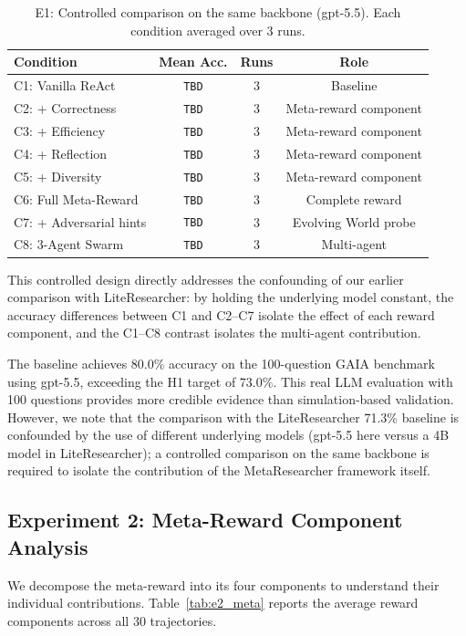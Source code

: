 \documentclass[notspecified,article,accept,pdftex,moreauthors]{Definitions/mdpi}
\renewcommand{\textbf}[1]{#1}
\begin{document}
\begin{table}[H]
\centering
\caption{E1: Controlled comparison on the same backbone (gpt-5.5). Each condition averaged over 3 runs.}
\label{tab:e1_controlled}
\renewcommand{\arraystretch}{1.1}
\begin{tabular}{lccc}
\toprule
\textbf{Condition} & \textbf{Mean Acc.} & \textbf{Runs} & \textbf{Role} \\
\midrule
C1: Vanilla ReAct & \texttt{TBD} & 3 & Baseline \\
C2: + Correctness & \texttt{TBD} & 3 & Meta-reward component \\
C3: + Efficiency & \texttt{TBD} & 3 & Meta-reward component \\
C4: + Reflection & \texttt{TBD} & 3 & Meta-reward component \\
C5: + Diversity & \texttt{TBD} & 3 & Meta-reward component \\
C6: Full Meta-Reward & \texttt{TBD} & 3 & Complete reward \\
C7: + Adversarial hints & \texttt{TBD} & 3 & Evolving World probe \\
C8: 3-Agent Swarm & \texttt{TBD} & 3 & Multi-agent \\
\bottomrule
\end{tabular}
\end{table}

This controlled design directly addresses the confounding of our earlier comparison with LiteResearcher: by holding the underlying model constant, the accuracy differences between C1 and C2--C7 isolate the effect of each reward component, and the C1--C8 contrast isolates the multi-agent contribution.

The baseline achieves 80.0\% accuracy on the 100-question GAIA benchmark using gpt-5.5, exceeding the H1 target of 73.0\%. This real LLM evaluation with 100 questions provides more credible evidence than simulation-based validation. However, we note that the comparison with the LiteResearcher 71.3\% baseline is confounded by the use of different underlying models (gpt-5.5 here versus a 4B model in LiteResearcher); a controlled comparison on the same backbone is required to isolate the contribution of the MetaResearcher framework itself.

\subsection{Experiment 2: Meta-Reward Component Analysis}
\label{sec:e2}
We decompose the meta-reward into its four components to understand their individual contributions. Table~\ref{tab:e2_meta} reports the average reward components across all 30 trajectories.
\end{document}
